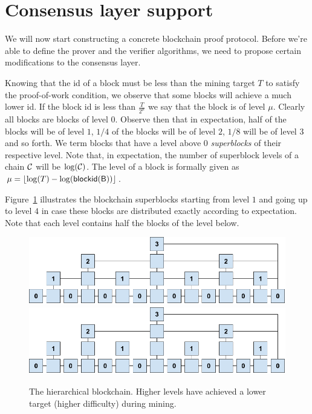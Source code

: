 \section{Consensus layer support}

We will now start constructing a concrete blockchain proof protocol. Before
we're able to define the prover and the verifier algorithms, we need to propose
certain modifications to the consensus layer.

Knowing that the id of a block must be less than the mining target $T$ to
satisfy the proof-of-work condition, we observe that some blocks will achieve a
much lower id. If the block id is less than $\frac{T}{2^\mu}$ we say that the
block is of level $\mu$. Clearly all blocks are blocks of level $0$. Observe
then that in expectation, half of the blocks will be of level $1$, $1/4$ of the
blocks will be of level $2$, $1/8$ will be of level $3$ and so forth. We term
blocks that have a level above 0 \textit{superblocks} of their respective
level. Note that, in expectation, the number of superblock levels of a chain
$\mathcal{C}$ will be $\log(\mathcal{C})$. The level of a block is formally given as $\mu
= \left \lfloor \log(T) - \log(\sf{blockid}(B)) \right \rfloor$.

Figure~\ref{fig.hierarchy} illustrates the blockchain superblocks starting from
level $1$ and going up to level $4$ in case these blocks are distributed
exactly according to expectation. Note that each level contains half the blocks
of the level below.

\begin{figure}
    \caption{The hierarchical blockchain.
    Higher levels have achieved a lower target (higher difficulty) during mining.}
    \centering
    \iftwocolumn
        \includegraphics[width=\columnwidth,keepaspectratio]{figures/hierarchical-ledger.png}
    \else
        \includegraphics[width=0.7\columnwidth,keepaspectratio]{figures/hierarchical-ledger.png}
    \fi
    \label{fig.hierarchy}
\end{figure}

